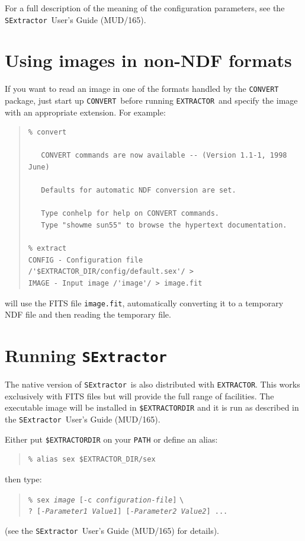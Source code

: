 \documentclass[twoside,11pt]{article}
\newcommand{\htmladdnormallink}[2]{#1}
\newcommand{\latex}[1]{#1}
\newcommand{\xref}[3]{#1}
\newcommand{\xlabel}[1]{}
\renewcommand{\_}{\texttt{\symbol{95}}}
\newcommand{\EXTRACTOR}{\texttt{EXTRACTOR}}
\newcommand{\CONVERT}{\texttt{CONVERT}}
\newcommand{\SExtractor}{\texttt{SExtractor}}
\newcommand{\MUD}{mud165.ps}
\begin{document}
For a full description of the meaning of the configuration parameters, see
the
\htmladdnormallink{\SExtractor\ User's Guide}{\MUD}\latex{ (MUD/165)}.

\section{\xlabel{using_images_in_nonndf_formats}Using images in non-NDF formats}
If you want to read an image in one of the
\xref{formats handled by the
\CONVERT}{sun55}{the_default_conversion_commands} package,
just start up \CONVERT\ before running \EXTRACTOR\ and specify the image with
an appropriate extension. For example:

\begin{quote} \begin{verbatim}
% convert

   CONVERT commands are now available -- (Version 1.1-1, 1998 June)

   Defaults for automatic NDF conversion are set.

   Type conhelp for help on CONVERT commands.
   Type "showme sun55" to browse the hypertext documentation.

% extract
CONFIG - Configuration file /'$EXTRACTOR_DIR/config/default.sex'/ >
IMAGE - Input image /'image'/ > image.fit
\end{verbatim} \end{quote}
will use the FITS file \texttt{image.fit}, automatically converting it to a
temporary NDF file and then reading the temporary file.

\section{\xlabel{running_sextractor}Running \SExtractor \label{running_sextractor}}
The native version of \SExtractor\ is also distributed with \EXTRACTOR.
This works exclusively with FITS files but will provide the full range of
facilities. The executable image will be installed in \texttt{\$EXTRACTOR\_DIR}
and it is run as described in the
\htmladdnormallink{\SExtractor\ User's Guide}{\MUD}\latex{ (MUD/165)}.

Either put \texttt{\$EXTRACTOR\_DIR} on your \texttt{PATH} or define an alias:
\begin{quote} \begin{verbatim}
% alias sex $EXTRACTOR_DIR/sex
\end{verbatim}\end{quote}
then type:
\begin{quote}
\texttt{\% sex \textit{image} [-c \textit{configuration-file}]} \verb!\! \\
\texttt{? [-\textit{Parameter1 Value1}] [-\textit{Parameter2 Value2}] ...}
\end{quote}
(see the
\htmladdnormallink{\SExtractor\ User's Guide}{\MUD}\latex{ (MUD/165)}
for details).
\end{document}
